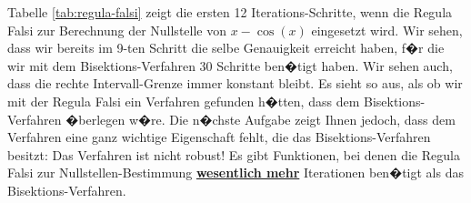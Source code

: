 Tabelle \ref{tab:regula-falsi} zeigt die ersten 12 Iterations-Schritte, wenn die Regula Falsi
zur Berechnung der Nullstelle von $x  - \cos(x)$ eingesetzt wird.  Wir sehen,
dass wir bereits im 9-ten Schritt die selbe Genauigkeit erreicht haben, f�r die wir mit
dem Bisektions-Verfahren 30 Schritte ben�tigt haben.  Wir sehen auch, dass die rechte
Intervall-Grenze immer konstant bleibt.  Es sieht so aus, als ob wir mit der Regula Falsi
ein Verfahren gefunden h�tten, dass dem Bisektions-Verfahren �berlegen w�re.  Die n�chste Aufgabe
zeigt Ihnen jedoch, dass dem Verfahren eine ganz wichtige Eigenschaft fehlt, die das
Bisektions-Verfahren besitzt:  Das Verfahren ist nicht robust!  Es gibt Funktionen, bei
denen die Regula Falsi zur Nullstellen-Bestimmung \textbf{\underline{wesentlich mehr}} Iterationen
ben�tigt als das Bisektions-Verfahren.
\vspace*{0.3cm}

\begin{table}[!h]
  \centering
{}
  \caption{Die ersten 12 Schritte der Regula Falsi zur L�sung von $x - \cos(x) = 0$.}
  \label{tab:regula-falsi}
\end{table}


